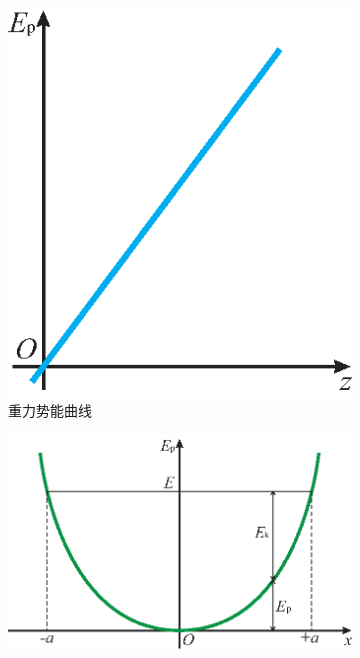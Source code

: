 \begin{figure}[H]
	\centering
	\begin{subfigure}[t]{0.4\textwidth}
		\centering
		\includegraphics[width=\textwidth]{C3-kbfig3.1.eps}
		\caption{重力势能曲线}
		\label{C3-kbfig3.1}
	\end{subfigure}
	\begin{subfigure}[t]{0.4\textwidth}
		\centering
		\includegraphics[width=\textwidth]{C3-kbfig3.3.eps}

\end{subfigure}
\end{figure}
